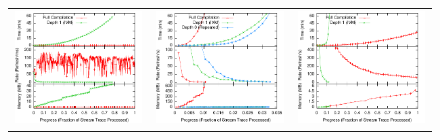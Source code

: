\begin{figure}
\begin{center}
\begin{minipage}{\textwidth}
\begin{tabular}{ccc}
\includegraphics[width=\figurewidth]{../graphs/graphs/unified_brokervariance.pdf} & 
\includegraphics[width=\figurewidth]{../graphs/graphs/unified_tpch18.pdf} &
\includegraphics[width=\figurewidth]{../graphs/graphs/unified_serverload.pdf} 

\end{tabular}
\end{minipage}
\end{center}
\end{figure}
